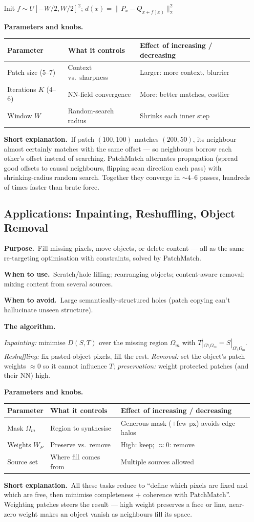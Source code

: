 \documentclass[10pt]{article}
\makeatletter
\newcommand{\Purpose}{\par\smallskip\textbf{Purpose.}\ }
\newcommand{\WhenUse}{\par\textbf{When to use.}\ }
\newcommand{\WhenAvoid}{\par\textbf{When to avoid.}\ }
\newcommand{\TheAlgo}{\par\smallskip\textbf{The algorithm.}\par\nopagebreak}
\newcommand{\Knobs}{\par\smallskip\textbf{Parameters and knobs.}\par\nopagebreak}
\newcommand{\ShortExp}{\par\smallskip\textbf{Short explanation.}\ }
\newenvironment{ptable}{\begin{center}\small\begin{tabular}{@{}p{2.5cm} p{5.9cm} p{6.2cm}@{}}\toprule
Parameter & What it controls & Effect of increasing / decreasing \\ \midrule}
{\bottomrule\end{tabular}\end{center}}
\makeatother
\begin{document}
\begin{algorithm}[H]
\SetAlgoLined
{}
Init $f\sim U[-W/2,W/2]^2$; $d(x)=\|P_x-Q_{x+f(x)}\|_2^2$\;
\caption{PatchMatch (1-NN)}
\end{algorithm}

\Knobs
\begin{ptable}
Patch size (5--7) & Context vs.\ sharpness & Larger: more context, blurrier \\
Iterations $K$ (4--6) & NN-field convergence & More: better matches, costlier \\
Window $W$ & Random-search radius & Shrinks each inner step \\
\end{ptable}
\ShortExp If patch $(100,100)$ matches $(200,50)$, its neighbour almost certainly matches with the same
offset --- so neighbours borrow each other's offset instead of searching. PatchMatch alternates propagation
(spread good offsets to causal neighbours, flipping scan direction each pass) with shrinking-radius random
search. Together they converge in $\sim4$--$6$ passes, hundreds of times faster than brute force.

\subsection{Applications: Inpainting, Reshuffling, Object Removal}
\Purpose Fill missing pixels, move objects, or delete content --- all as the same re-targeting optimisation
with constraints, solved by PatchMatch.
\WhenUse Scratch/hole filling; rearranging objects; content-aware removal; mixing content from several
sources.
\WhenAvoid Large semantically-structured holes (patch copying can't hallucinate unseen structure).
\TheAlgo \emph{Inpainting:} minimise $D(S,T)$ over the missing region $\Omega_m$ with
$T|_{\Omega\setminus\Omega_m}=S|_{\Omega\setminus\Omega_m}$. \emph{Reshuffling:} fix pasted-object pixels,
fill the rest. \emph{Removal:} set the object's patch weights $\approx0$ so it cannot influence $T$;
\emph{preservation:} weight protected patches (and their NN) high.
\Knobs
\begin{ptable}
Mask $\Omega_m$ & Region to synthesise & Generous mask ($+$few px) avoids edge halos \\
Weights $W_P$ & Preserve vs.\ remove & High: keep; $\approx0$: remove \\
Source set & Where fill comes from & Multiple sources allowed \\
\end{ptable}
\ShortExp All these tasks reduce to ``define which pixels are fixed and which are free, then minimise
completeness $+$ coherence with PatchMatch''. Weighting patches steers the result --- high weight preserves
a face or line, near-zero weight makes an object vanish as neighbours fill its space.
\end{document}
